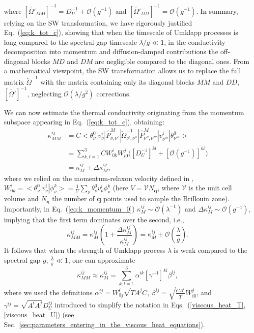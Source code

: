 \documentclass[
prb,
twocolumn,
superscriptaddress,
 amsmath,amssymb,
 aps,
longbibliography,
]{revtex4-2}
\begin{document}
where $[\breve{\Omega'}_{MM}]^{{-}1} {=} D_U^{-1}{+}\mathcal{O}(g^{-1})$ and
$[\breve{\Omega'}_{DD}]^{{-}1} {=} \mathcal{O}(g^{-1})$.
In summary, relying on the SW transformation, we have rigorously justified Eq.~(\ref{eq:k_tot_c}), showing that when the timescale of Umklapp processes is long compared to the spectral-gap timescale  $\lambda/g \ll 1$, in the conductivity decomposition into momentum and diffusion-damped contributions the off-diagonal blocks $MD$ and $DM$ are negligible compared to the diagonal ones. From a mathematical viewpoint, the SW transformation allows us to replace the full matrix $\breve{\Omega}^{-1}$ with the matrix containing only its diagonal blocks $MM$ and $DD$, $[\breve{\Omega'}]^{-1}$, neglecting $\mathcal{O}(\lambda/g^2)$ corrections.

We can now estimate the thermal conductivity originating from the momentum subspace appearing in Eq.~(\ref{eq:k_tot_c}), obtaining:
\begin{equation}
\begin{split}
\kappa^{ij}_{MM}&=C \big<\theta^{0}_{\nu} | v^i_{\nu} |\hat P^{M}_{\nu,\nu'}| {{\breve{\Omega}}^{-1}_{\nu',\nu''}} |\hat P^{M}_{\nu'',\nu'''} | {v}^j_{\nu'''} | \theta^{0}_{\nu'''}\big>\\
&= \sum_{k,l=1}^3 C
W^i_{0k} W^j_{l0} \Big([D^{-1}_U]^{kl}+[\mathcal{O}(g^{-1})]^{kl}\Big)\\

&= \kappa^{ij}_{M} +\Delta \kappa^{ij}_{M},
\label{eq:k_momentum_0}
\end{split}
\end{equation}
where we relied on the momentum-relaxon velocity defined in \cite{Simoncelli2020}, $W^i_{0k}=\big<\theta^0_\nu|v^i_\nu|\phi^k_\nu\big>=\frac{1}{V}\sum_\nu \theta^0_\nu v^i_\nu \phi^k_\nu$ (here $V=\mathcal{V}N_{\bm{q}}$, where $\mathcal{V}$ is the unit cell volume and $N_{\bm{q}}$ the number of $\bm{q}$ points used to sample the Brillouin zone).
Importantly, in Eq.~(\ref{eq:k_momentum_0}) $\kappa^{ij}_{M}{\sim} \mathcal{O}(\lambda^{-1})$ and $\Delta \kappa^{ij}_{M}{\sim} \mathcal{O}(g^{-1})$, implying that the first term dominates over the second, i.e.,
\begin{equation}
  \kappa^{ij}_{MM}=\kappa^{ij}_{M}\left(1+ \frac{\Delta \kappa^{ij}_{M}}{\kappa^{ij}_{M}} \right)= \kappa^{ij}_{M} + \mathcal{O}\left(\frac{\lambda}{g}\right).
  \label{eq:k_momentum_1}
\end{equation}
It follows that when the strength of Umklapp process $\lambda$ is weak compared to the spectral gap $g$, $\frac{\lambda}{g}{\ll} 1$, one can approximate
\begin{equation}
\kappa^{ij}_{MM}{\approx}\kappa^{ij}_{M}=\sum_{k,l=1}^3\alpha^{ik}[\gamma^{-1}]^{kl}\beta^{lj},
\label{eq:k_momentum}
\end{equation}
where we used the definitions $\alpha^{ij}{=}W_{0j}^i\sqrt{\overline T A^jC}$, $\beta^{ij}{=}\sqrt{\frac{CA^i}{\overline T}} W_{i0}^j$, and $\gamma^{ij}{=}\sqrt{A^i A^j} D_U^{ij}$ introduced to simplify the notation in Eqs.~(\ref{viscous_heat_T}, \ref{viscous_heat_U}) (see Sec.~\ref{sec:parameters_entering_in_the_viscous_heat_equations}).
\end{document}
